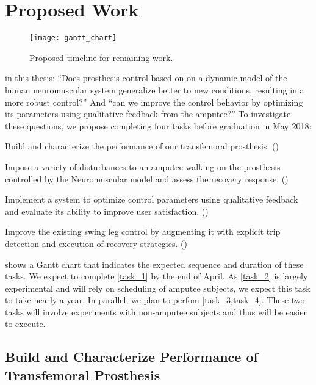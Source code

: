 \chapter{Proposed Work}
\begin{figure*}[h]
    \centering
    \texttt{[image: gantt\_chart]}
    \caption{Proposed timeline for remaining work.}\label{fig:gantt_chart}
\end{figure*}

 in this thesis: ``Does prosthesis
control based on on a dynamic model of the human neuromuscular system generalize
better to new conditions, resulting in a more robust control?'' And ``can we
improve the control behavior by optimizing its parameters using qualitative
feedback from the amputee?'' To investigate these questions, we propose
completing four tasks before graduation in May 2018: 
\begin{tasks} 
    \item\label{task_1} Build and characterize the performance of our
    transfemoral prosthesis. ()

    \item\label{task_2} Impose a variety of disturbances to an amputee walking
    on the prosthesis controlled by the Neuromuscular model and assess the
    recovery response. ()

    \item\label{task_3} Implement a system to optimize control parameters using
    qualitative feedback and evaluate its ability to improve user satisfaction.
    ()

    \item\label{task_4} Improve the existing swing leg control by augmenting it
    with explicit trip detection and execution of recovery strategies.
    ()
\end{tasks}

 shows a Gantt chart that indicates the expected sequence
and duration of these tasks. We expect to complete \cref{task_1} by the end of
April. As \cref{task_2} is largely experimental and will rely on scheduling of
amputee subjects, we expect this task to take nearly a year. In parallel, we
plan to perfom \cref{task_3,task_4}. These two tasks will involve experiments
with non-amputee subjects and thus will be easier to execute.

\section{Build and Characterize Performance of Transfemoral
Prosthesis}\label{sec:proposed_build}

